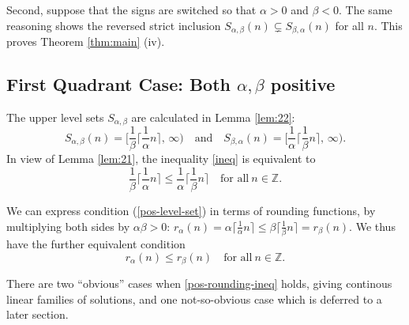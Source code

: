 \documentclass[12pt,letterpaper, reqno]{amsart}
\theoremstyle{definition}
\theoremstyle{remark}
\newcommand{\ZZ}{\ensuremath{\mathbb{Z}}}
\newcommand{\floor}[1]{\lfloor{#1}\rfloor}
\newcommand{\ceil}[1]{\lceil{#1}\rceil}
\begin{document}
Second, suppose that
 the signs are switched so that $\alpha >0$ and $\beta<0$.
 The same reasoning shows the reversed strict inclusion $S_{\alpha,\beta}(n)\subsetneq S_{\beta,\alpha}(n)$ for all $n$.
This proves Theorem \ref{thm:main} (iv).

%
%
\subsection{First Quadrant Case: Both $\alpha,\beta$ positive}\label{sec:32}
The upper level sets $S_{\alpha,\beta}$ are calculated in Lemma \ref{lem:22}:
\[ 
S_{\alpha,\beta}(n)  = \bigg[ \frac1\beta \ceil{\frac{1}{\alpha}n}, \,\infty \bigg)
\quad\text{and}\quad
 S_{\beta,\alpha}(n) = \bigg[ \frac1\alpha \ceil{\frac{1}{\beta} n}, \, \infty \bigg).
 \]
 In view of Lemma \ref{lem:21}, the inequality \eqref{ineq} is equivalent to
\begin{equation}\label{pos-level-set}
\frac1\beta \ceil{ \frac{1}{\alpha}n} \leq \frac1\alpha \ceil{\frac{1}{\beta}n} \quad\text{for all}\ n\in\ZZ.
\end{equation}

We can  express
 condition (\ref{pos-level-set}) in terms of rounding functions,
 by  multiplying both sides by $\alpha\beta>0$:
 $r_\alpha(n) =\alpha \ceil{\frac{1}{\alpha} n} \leq \beta \ceil{\frac{1}{\beta} n}= r_\beta(n)$.
We thus have the further equivalent condition
\begin{equation}\label{pos-rounding-ineq}
r_{\alpha}(n) \leq r_{\beta}(n)  \quad\text{for all}\ n\in\ZZ.
\end{equation}

There are two ``obvious'' cases when \eqref{pos-rounding-ineq} holds, giving continous linear families of solutions, and one not-so-obvious case which is deferred to a later section.
\end{document}
